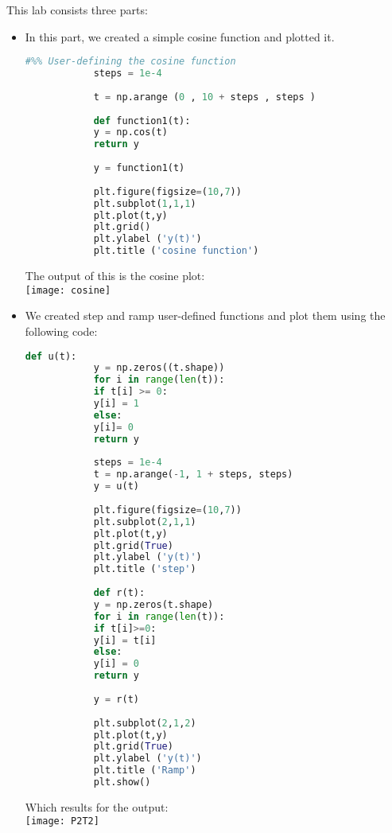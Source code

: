 \documentclass[11pt,a4]{Lab2 Report}
\begin{document}
	This lab consists three parts:
	\begin{itemize}
		\item
		
		
		In this part, we created a simple cosine function and plotted it.
		\begin{lstlisting}[language=Python]
			#%% User-defining the cosine function
			steps = 1e-4
			
			t = np.arange (0 , 10 + steps , steps )
			
			def function1(t): 
			y = np.cos(t) 
			return y 
			
			y = function1(t)  
			
			plt.figure(figsize=(10,7))
			plt.subplot(1,1,1)
			plt.plot(t,y)
			plt.grid()
			plt.ylabel ('y(t)')
			plt.title ('cosine function')
		\end{lstlisting}
		
		The output of this is the cosine plot:\\
		\texttt{[image: cosine]}
		\item
		

		We created step and ramp user-defined functions and plot them using the following code:\\
		\begin{lstlisting}[language=Python]
			def u(t): 
			y = np.zeros((t.shape))
			for i in range(len(t)):
			if t[i] >= 0:
			y[i] = 1
			else:
			y[i]= 0
			return y        
			
			steps = 1e-4
			t = np.arange(-1, 1 + steps, steps)
			y = u(t)
			
			plt.figure(figsize=(10,7))
			plt.subplot(2,1,1)
			plt.plot(t,y)
			plt.grid(True)
			plt.ylabel ('y(t)')
			plt.title ('step')
			
			def r(t): 
			y = np.zeros(t.shape)
			for i in range(len(t)):
			if t[i]>=0:
			y[i] = t[i]
			else:
			y[i] = 0
			return y       
			
			y = r(t)
			
			plt.subplot(2,1,2)
			plt.plot(t,y)
			plt.grid(True)
			plt.ylabel ('y(t)')
			plt.title ('Ramp')
			plt.show()
		\end{lstlisting}
		
		Which results for the output:\\
		\texttt{[image: P2T2]}\\


\end{itemize}
\end{document}
